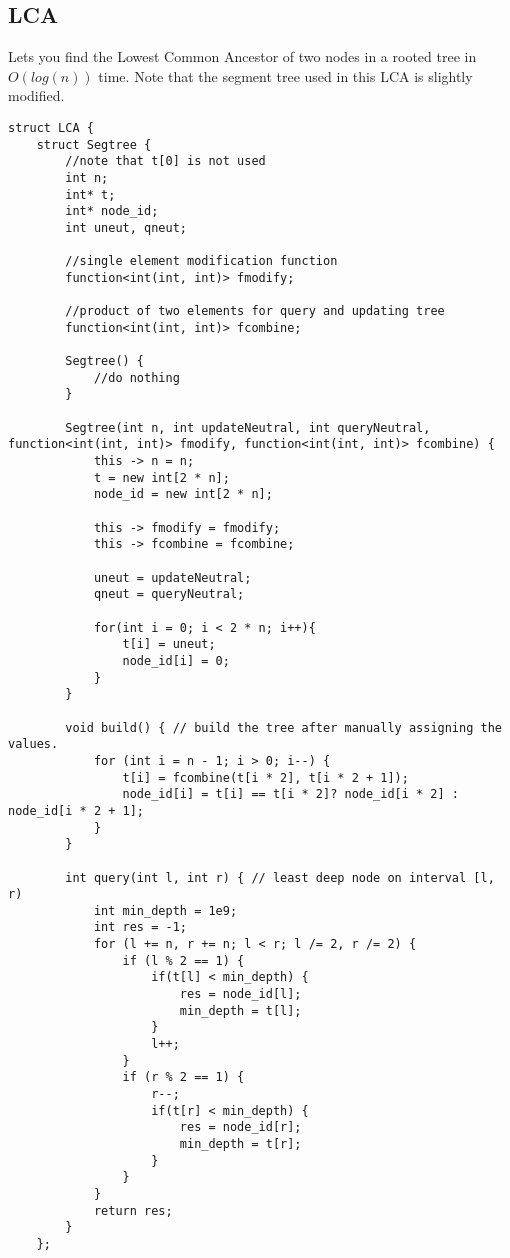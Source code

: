 \documentclass[8pt, headheight=10pt, a4paper]{article}
\begin{document}
\begin{multicols*}{3}
\subsection{LCA}
Lets you find the Lowest Common Ancestor of two nodes in a rooted tree in $O(log(n))$ time. 
Note that the segment tree used in this LCA is slightly modified. 
\begin{lstlisting}
struct LCA {
    struct Segtree {
        //note that t[0] is not used
        int n;
        int* t;
        int* node_id;
        int uneut, qneut;

        //single element modification function
        function<int(int, int)> fmodify;

        //product of two elements for query and updating tree
        function<int(int, int)> fcombine;

        Segtree() {
            //do nothing
        }

        Segtree(int n, int updateNeutral, int queryNeutral, function<int(int, int)> fmodify, function<int(int, int)> fcombine) {
            this -> n = n;
            t = new int[2 * n];
            node_id = new int[2 * n];

            this -> fmodify = fmodify;
            this -> fcombine = fcombine;

            uneut = updateNeutral;
            qneut = queryNeutral;

            for(int i = 0; i < 2 * n; i++){
                t[i] = uneut;
                node_id[i] = 0;
            }
        }

        void build() { // build the tree after manually assigning the values.
            for (int i = n - 1; i > 0; i--) {   
                t[i] = fcombine(t[i * 2], t[i * 2 + 1]);
                node_id[i] = t[i] == t[i * 2]? node_id[i * 2] : node_id[i * 2 + 1];
            }
        }

        int query(int l, int r) { // least deep node on interval [l, r)
            int min_depth = 1e9;
            int res = -1;
            for (l += n, r += n; l < r; l /= 2, r /= 2) {
                if (l % 2 == 1) {
                    if(t[l] < min_depth) {
                        res = node_id[l];
                        min_depth = t[l];
                    }
                    l++;
                }
                if (r % 2 == 1) {
                    r--;
                    if(t[r] < min_depth) {
                        res = node_id[r];
                        min_depth = t[r];
                    }
                }
            }
            return res;
        }
    };


\end{lstlisting}
\end{multicols*}
\end{document}
